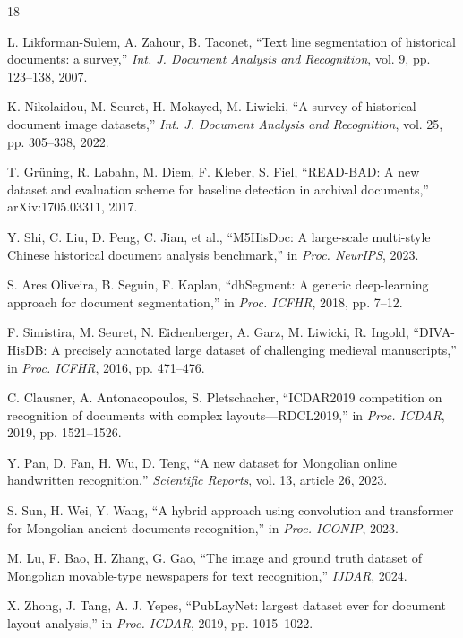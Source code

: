 \documentclass[5p,times,twocolumn]{elsarticle}
\begin{document}
\begin{thebibliography}{18}

L. Likforman-Sulem, A. Zahour, B. Taconet, ``Text line segmentation of historical documents: a survey,'' \emph{Int. J. Document Analysis and Recognition}, vol. 9, pp. 123--138, 2007.

K. Nikolaidou, M. Seuret, H. Mokayed, M. Liwicki, ``A survey of historical document image datasets,'' \emph{Int. J. Document Analysis and Recognition}, vol. 25, pp. 305--338, 2022.

T. Gr\"uning, R. Labahn, M. Diem, F. Kleber, S. Fiel, ``READ-BAD: A new dataset and evaluation scheme for baseline detection in archival documents,'' arXiv:1705.03311, 2017.

Y. Shi, C. Liu, D. Peng, C. Jian, et al., ``M5HisDoc: A large-scale multi-style Chinese historical document analysis benchmark,'' in \emph{Proc. NeurIPS}, 2023.

S. Ares Oliveira, B. Seguin, F. Kaplan, ``dhSegment: A generic deep-learning approach for document segmentation,'' in \emph{Proc. ICFHR}, 2018, pp. 7--12.

F. Simistira, M. Seuret, N. Eichenberger, A. Garz, M. Liwicki, R. Ingold, ``DIVA-HisDB: A precisely annotated large dataset of challenging medieval manuscripts,'' in \emph{Proc. ICFHR}, 2016, pp. 471--476.

C. Clausner, A. Antonacopoulos, S. Pletschacher, ``ICDAR2019 competition on recognition of documents with complex layouts---RDCL2019,'' in \emph{Proc. ICDAR}, 2019, pp. 1521--1526.

Y. Pan, D. Fan, H. Wu, D. Teng, ``A new dataset for Mongolian online handwritten recognition,'' \emph{Scientific Reports}, vol. 13, article 26, 2023.

S. Sun, H. Wei, Y. Wang, ``A hybrid approach using convolution and transformer for Mongolian ancient documents recognition,'' in \emph{Proc. ICONIP}, 2023.

M. Lu, F. Bao, H. Zhang, G. Gao, ``The image and ground truth dataset of Mongolian movable-type newspapers for text recognition,'' \emph{IJDAR}, 2024.

X. Zhong, J. Tang, A. J. Yepes, ``PubLayNet: largest dataset ever for document layout analysis,'' in \emph{Proc. ICDAR}, 2019, pp. 1015--1022.


\end{thebibliography}
\end{document}
